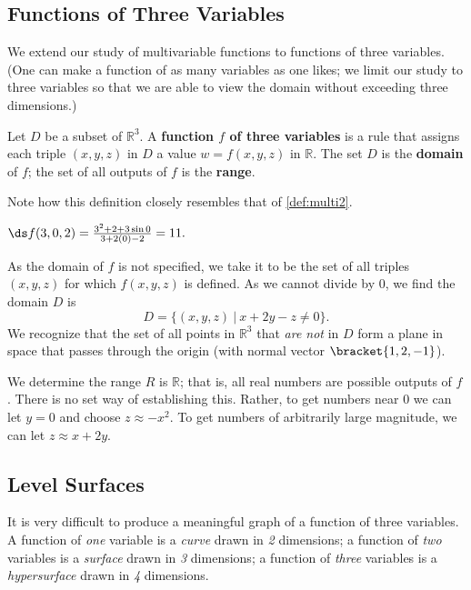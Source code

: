 \subsection{Functions of Three Variables}

We extend our study of multivariable functions to functions of three variables. (One can make a function of as many variables as one likes; we limit our study to three variables so that we are able to view the domain without exceeding three dimensions.)

{Let $D$ be a subset of $\mathbb{R}^3$. A \textbf{function $f$ of three variables} is a rule that assigns each triple $(x,y,z)$ in $D$ a value $w=f(x,y,z)$ in $\mathbb{R}$. The set $D$ is the \textbf{domain} of $f$; the set of all outputs of $f$ is the \textbf{range}.
}

Note how this definition closely resembles that of \autoref{def:multi2}.

{$\ds f(3,0,2) = \frac{3^2+2+3\sin 0}{3+2(0)-2} = 11.$

As the domain of $f$ is not specified, we take it to be the set of all triples $(x,y,z)$ for which $f(x,y,z)$ is defined. As we cannot divide by $0$, we find the domain $D$ is 
\[D = \{(x,y,z)\ |\ x+2y-z\neq 0\}.\]
We recognize that the set of all points in $\mathbb{R}^3$ that \textit{are not} in $D$ form a plane in space that passes through the origin (with normal vector $\bracket{1,2,-1}$). 

We determine the range $R$ is $\mathbb{R}$; that is, all real numbers are possible outputs of $f$. There is no set way of establishing this. Rather, to get numbers near 0 we can let $y=0$ and choose $z \approx -x^2$. To get numbers of arbitrarily large magnitude, we can let $z\approx x+2y$. }

\subsection{Level Surfaces}

It is very difficult to produce a meaningful graph of a function of three variables. A function of \textit{one} variable is a \textit{curve} drawn in \textit{2} dimensions; a function of \textit{two} variables is a \textit{surface} drawn in \textit{3} dimensions; a function of \textit{three} variables is a \textit{hypersurface} drawn in \textit{4} dimensions.

